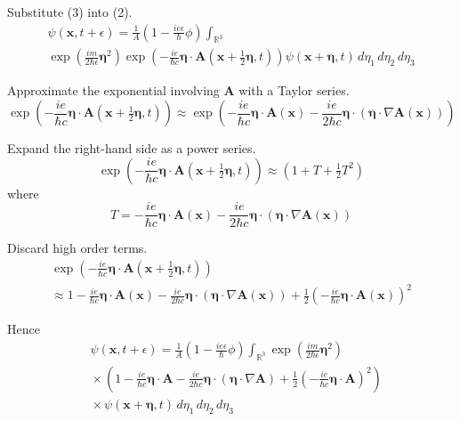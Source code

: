 \documentclass[12pt]{article}
\newcommand\INT{\int_{\mathbb R^3}}
\begin{document}
Substitute (3) into (2).
\begin{multline*}
\psi(\mathbf x,t+\epsilon)=
\frac{1}{A}\left(1-\frac{ie\epsilon}{\hbar}\phi\right)\INT
\\
\exp\left(\frac{im}{2\hbar\epsilon}\boldsymbol\eta^2\right)
\exp\left(-\frac{ie}{\hbar c}\boldsymbol\eta\cdot\mathbf A\left(\mathbf x+\tfrac{1}{2}\boldsymbol\eta,t\right)\right)
\psi(\mathbf x+\boldsymbol\eta,t)
\,d\eta_1\,d\eta_2\,d\eta_3
\end{multline*}

Approximate the exponential involving $\mathbf A$ with a Taylor series.
\begin{equation*}
\exp\left(-\frac{ie}{\hbar c}\boldsymbol\eta\cdot\mathbf A\left(\mathbf x+\tfrac{1}{2}\boldsymbol\eta,t\right)\right)
\approx
\exp\left(
-\frac{ie}{\hbar c}\boldsymbol\eta\cdot\mathbf A(\mathbf x)
-\frac{ie}{2\hbar c}\boldsymbol\eta\cdot(\boldsymbol\eta\cdot\nabla\mathbf A(\mathbf x))
\right)
\end{equation*}

Expand the right-hand side as a power series.
\begin{equation*}
\exp\left(-\frac{ie}{\hbar c}\boldsymbol\eta\cdot\mathbf A\left(\mathbf x+\tfrac{1}{2}\boldsymbol\eta,t\right)\right)
\approx
\left(1+T+\tfrac{1}{2}T^2\right)
\end{equation*}
where
\begin{equation*}
T=-\frac{ie}{\hbar c}\boldsymbol\eta\cdot\mathbf A(\mathbf x)
-\frac{ie}{2\hbar c}\boldsymbol\eta\cdot(\boldsymbol\eta\cdot\nabla\mathbf A(\mathbf x))
\end{equation*}

Discard high order terms.
\begin{multline*}
\exp\left(-\frac{ie}{\hbar c}\boldsymbol\eta\cdot\mathbf A\left(\mathbf x+\tfrac{1}{2}\boldsymbol\eta,t\right)\right)
\\
\approx
1
-\frac{ie}{\hbar c}\boldsymbol\eta\cdot\mathbf A(\mathbf x)
-\frac{ie}{2\hbar c}\boldsymbol\eta\cdot(\boldsymbol\eta\cdot\nabla\mathbf A(\mathbf x))
+\frac{1}{2}\left(-\frac{ie}{\hbar c}\boldsymbol\eta\cdot\mathbf A(\mathbf x)\right)^2
\end{multline*}

Hence
\begin{align*}
&\psi(\mathbf x,t+\epsilon)=
\frac{1}{A}
\left(1-\frac{ie\epsilon}{\hbar}\phi\right)
\INT\exp\left(\frac{im}{2\hbar\epsilon}\boldsymbol\eta^2\right)
\\
&{}\times\left(
1
-\frac{ie}{\hbar c}\boldsymbol\eta\cdot\mathbf A
-\frac{ie}{2\hbar c}\boldsymbol\eta\cdot(\boldsymbol\eta\cdot\nabla\mathbf A)
+\frac{1}{2}\left(-\frac{ie}{\hbar c}\boldsymbol\eta\cdot\mathbf A\right)^2
\right)
\\
&{}\times\psi(\mathbf x+\boldsymbol\eta,t)
\,d\eta_1\,d\eta_2\,d\eta_3
\tag{4}
\end{align*}
\end{document}
